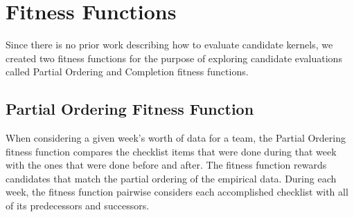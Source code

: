 \documentclass[3p,times,procedia]{elsarticle}
\begin{document}
\section{Fitness Functions}

Since there is no prior work describing how to evaluate candidate kernels, we created two fitness functions for the purpose of exploring candidate evaluations called Partial Ordering and Completion fitness functions. 
\subsection{Partial Ordering Fitness Function}
When considering a given week's worth of data for a team, the Partial Ordering fitness function compares the checklist items that were done during that week with the ones that were done before and after. The fitness function rewards candidates that match the partial ordering of the empirical data. During each week, the fitness function pairwise considers each accomplished checklist with all of its predecessors and successors. 



\end{document}

